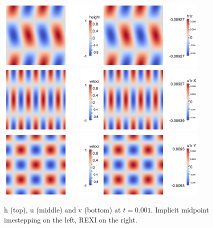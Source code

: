 \documentclass[14pt]{article}
\begin{document}
\begin{figure}
  \centering
  \includegraphics[width=0.45\textwidth]{results/IM_h}
  \includegraphics[width=0.45\textwidth]{results/REXI_h}\\
  \includegraphics[width=0.45\textwidth]{results/IM_u}
  \includegraphics[width=0.45\textwidth]{results/REXI_u}\\
  \includegraphics[width=0.45\textwidth]{results/IM_v}
  \includegraphics[width=0.45\textwidth]{results/REXI_v}
\caption{h (top), u (middle) and v (bottom) at $t=0.001$. Implicit midpoint imestepping on the left, REXI on the right.}
\end{figure}
\end{document}

